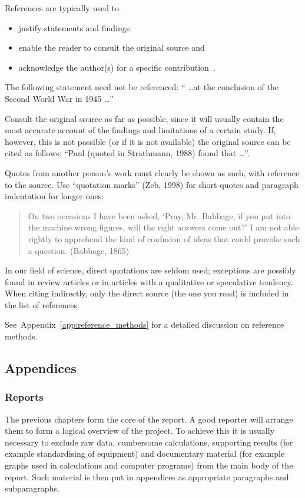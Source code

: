 \documentclass[a5paper, 10pt]{article}
\begin{document}
References are typically used to 
\begin{itemize}
\item justify statements and findings
\item enable the reader to consult the original source and
\item acknowledge the author(s) for a specific
  contribution~\citep{burger}.
\end{itemize}

The following statement need not be referenced: `` \dots at
the conclusion of the Second World War in 1945 \dots''

Consult the original source as far as possible, since it will usually
contain the most accurate account of the findings and limitations of a
certain study.  If, however, this is not possible (or if it is not
available) the original source can be cited as follows: ``Paul (quoted
in Strathmann, 1988) found that \dots''.  

Quotes from another person's work must clearly be shown as such, with
reference to the source.  Use ``quotation marks'' (Zeb, 1998) for
short quotes and paragraph indentation for longer ones:

\begin{quote}
  On two occasions I have been asked, `Pray, Mr. Babbage, if you put
  into the machine wrong figures, will the right answers come out?' I
  am not able rightly to apprehend the kind of confusion of ideas that
  could provoke such a question. (Babbage, 1865)
\end{quote}

In our field of science, direct quotations
are seldom used; exceptions are possibly found in review articles or
in articles with a qualitative or speculative tendency.  When citing
indirectly, only the direct source (the one you read) is included in
the list of references.

See~Appendix~\ref{app:reference_methods} for a detailed discussion on
reference methods.

\subsection{Appendices}
\label{sec:appendices}
\subsubsection{Reports}
The previous chapters form the core of the report.  A good reporter
will arrange them to form a logical overview of the project.  To
achieve this it is usually necessary to exclude raw data, cumbersome
calculations, supporting results (for example standardising of
equipment) and documentary material (for example graphs used in
calculations and computer programs) from the main body of the
report.  Such material is then put in appendices as appropriate
paragraphs and subparagraphs.
\end{document}
